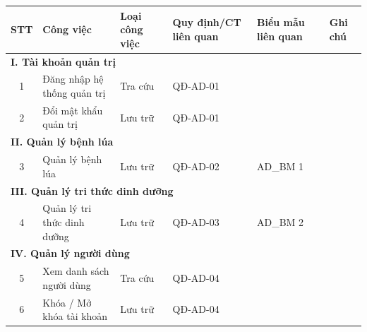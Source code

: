 \documentclass[12pt,a4paper]{article}
\begin{document}
\begin{longtable}{|
        c|
        >{\raggedright\arraybackslash}p{3.2cm}|
        >{\raggedright\arraybackslash}p{2.2cm}|
        >{\raggedright\arraybackslash}p{2.4cm}|
        >{\raggedright\arraybackslash}p{2.6cm}|
        >{\raggedright\arraybackslash}p{2.6cm}|}
    \hline
    \rowcolor{headerblue}
    \textbf{STT} & \textbf{Công việc}          & \textbf{Loại công việc} & \textbf{Quy định/CT liên quan} & \textbf{Biểu mẫu liên quan} & \textbf{Ghi chú} \\
    \hline
    \endhead
    \multicolumn{6}{|l|}{\cellcolor{notegreen}\textbf{I. Tài khoản quản trị}}                                                                              \\
    \hline
    1            & Đăng nhập hệ thống quản trị & Tra cứu                 & QĐ-AD-01                       &                             &                  \\
    \hline
    2            & Đổi mật khẩu quản trị       & Lưu trữ                 & QĐ-AD-01                       &                             &                  \\
    \hline
    \multicolumn{6}{|l|}{\cellcolor{notegreen}\textbf{II. Quản lý bệnh lúa}}                                                                               \\
    \hline
    3            & Quản lý bệnh lúa            & Lưu trữ                 & QĐ-AD-02                       & AD\_BM 1                    &                  \\
    \hline
    \multicolumn{6}{|l|}{\cellcolor{notegreen}\textbf{III. Quản lý tri thức dinh dưỡng}}                                                                   \\
    \hline
    4            & Quản lý tri thức dinh dưỡng & Lưu trữ                 & QĐ-AD-03                       & AD\_BM 2                    &                  \\
    \hline
    \multicolumn{6}{|l|}{\cellcolor{notegreen}\textbf{IV. Quản lý người dùng}}                                                                             \\
    \hline
    5            & Xem danh sách người dùng    & Tra cứu                 & QĐ-AD-04                       &                             &                  \\
    \hline
    6            & Khóa / Mở khóa tài khoản    & Lưu trữ                 & QĐ-AD-04                       &                             &                  \\

\end{longtable}
\end{document}
